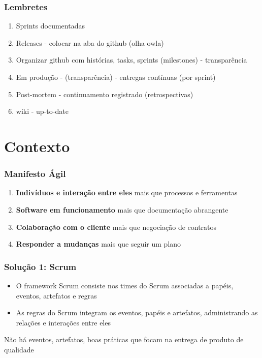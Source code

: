\begin{frame}
 \frametitle{Lembretes}
 \begin{enumerate}
  \item Sprints documentadas
  \item Releases - colocar na aba do github (olha owla)
  \item Organizar github com histórias, tasks, sprints (milestones) - transparência
  \item Em produção - (transparência) - entregas contínuas (por sprint)
  \item Post-mortem - continuamento registrado (retrospectivas)
  \item wiki - up-to-date
 \end{enumerate}
\end{frame}

\section{Contexto}
\begin{frame}
 \frametitle{Manifesto Ágil}
 \begin{enumerate}
  \item \textbf{Indivíduos e interação entre eles} mais que processos e ferramentas
  \item \textbf{Software em funcionamento}  mais que documentação abrangente
  \item \textbf{Colaboração com o cliente} mais que negociação de contratos
  \item \textbf{Responder a mudanças} mais que seguir um plano
 \end{enumerate}
\end{frame}

\begin{frame}
 \frametitle{Solução 1: Scrum}
 \begin{itemize}
  \item O framework Scrum consiste nos times do Scrum associadas a papéis, eventos, artefatos e
regras 	
  \item As regras do Scrum integram os eventos, papéis e artefatos, administrando as relações e
interações entre eles
 \end{itemize}
  \begin{block}{}
 Não há eventos, artefatos, boas práticas que focam na entrega de produto de qualidade
 \end{block}
\end{frame}

